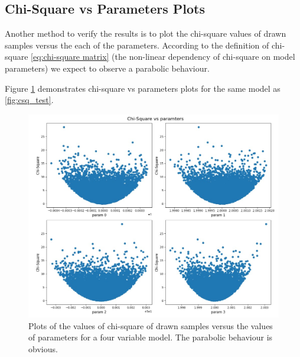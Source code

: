 \documentclass[12pt, TexShade, letterpaper]{report}
\begin{document}
\subsection{Chi-Square vs Parameters Plots}
\label{chap:method,sub:test,subsub:plot}
Another method to verify the results is to plot the chi-square values of drawn samples versus the each of the parameters. According to the definition of chi-square \ref{eq:chi-square matrix} (the non-linear dependency of chi-square on model parameters) we expect to observe a parabolic behaviour.\par
Figure \ref{fig:csq_params} demonstrates chi-square vs parameters plots for the same model as \ref{fig:csq_test}.
\begin{figure}[h!]
\centering
\includegraphics[scale =0.9]{csq_params.jpg}
\caption[Chi-Square vs parameters plots]{Plots of the values of chi-square of drawn samples versus the values of parameters for a four variable model. The parabolic behaviour is obvious.}
\label{fig:csq_params}
\end{figure}
\end{document}
